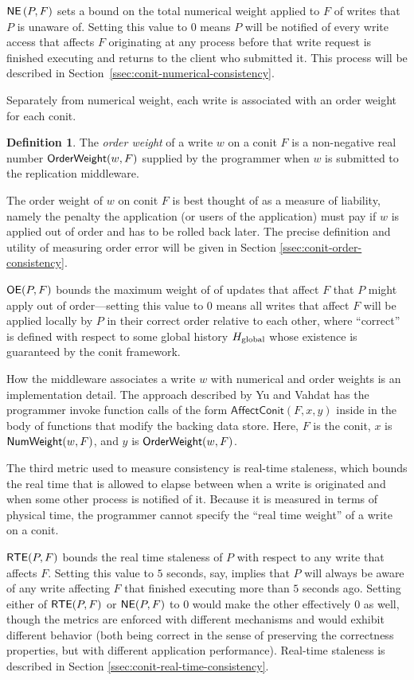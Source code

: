 \documentclass[]             %
{NASA}                       %
\theoremstyle{definition}
\newtheorem{definition}[theorem]{Definition}
\begin{document}
$\mathsf{NE}\left(P, F\right)$ sets a bound on the total numerical weight
applied to $F$ of writes that $P$ is unaware of. Setting this value to
$0$ means $P$ will be notified of every write access that affects $F$
originating at any process before that write request is finished
executing and returns to the client who submitted it. This process
will be described in Section~\ref{ssec:conit-numerical-consistency}.

Separately from numerical weight, each write is associated with an
order weight for each conit.
\begin{definition}
  The \emph{order weight} of a write $w$ on a conit $F$ is a
  non-negative real number $\mathsf{OrderWeight}(w, F)$ supplied by the
  programmer when $w$ is submitted to the replication middleware.
\end{definition}
\noindent The order weight of $w$ on conit $F$ is best thought of as a
measure of liability, namely the penalty the application (or users of
the application) must pay if $w$ is applied out of order and has to be
rolled back later. The precise definition and utility of measuring
order error will be given in Section
\ref{ssec:conit-order-consistency}.

$\mathsf{OE}(P, F)$ bounds the maximum weight of of
updates that affect $F$ that $P$ might apply out of order---setting
this value to $0$ means all writes that affect $F$ will be applied
locally by $P$ in their correct order relative to each other, where
``correct'' is defined with respect to some global history $H_\mathrm{global}$
whose existence is guaranteed by the conit framework.

How the middleware associates a write $w$ with numerical and order
weights is an implementation detail. The approach described by Yu and
Vahdat \cite{2002tact} has the programmer invoke function calls of the
form $\mathsf{AffectConit}(F, x, y)$ inside in the body of functions
that modify the backing data store. Here, $F$ is the conit, $x$ is
$\mathsf{NumWeight}(w, F)$, and $y$ is $\mathsf{OrderWeight}(w, F)$.

The third metric used to measure consistency is real-time staleness,
which bounds the real time that is allowed to elapse between when a
write is originated and when some other process is notified of
it. Because it is measured in terms of physical time, the programmer
cannot specify the ``real time weight'' of a write on a conit.

$\mathsf{RTE}(P, F)$ bounds the real time staleness of $P$ with respect to any
write that affects $F$. Setting this value to $5$ seconds, say,
implies that $P$ will always be aware of any write affecting $F$ that
finished executing more than $5$ seconds ago. Setting either of
$\mathsf{RTE}(P, F)$ or $\mathsf{NE}(P, F)$ to $0$ would make the other effectively
$0$ as well, though the metrics are enforced with different mechanisms
and would exhibit different behavior (both being correct in the sense
of preserving the correctness properties, but with different
application performance). Real-time staleness is described in
Section \ref{ssec:conit-real-time-consistency}.
\end{document}
